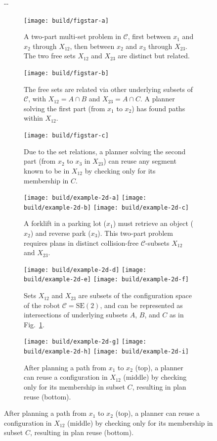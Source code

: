 \documentclass{report}
\newlength{\offsetpage}
\newenvironment{widepage}
   {\begin{adjustwidth}{-\offsetpage}{-\offsetpage}%
    \addtolength{\textwidth}{2\offsetpage}}%
{\end{adjustwidth}}
\begin{document}
\begin{figure}
\begin{widepage}
\centering

\begin{subfigure}[t]{.32\linewidth}
\centering
\texttt{[image: build/figstar-a]}
\caption{A two-part multi-set problem in $\mathcal{C}$,
  first between $x_1$ and $x_2$ through $X_{12}$,
  then between $x_2$ and $x_3$ through $X_{23}$.
  The two free sets $X_{12}$ and $X_{23}$ are distinct
  but related.}
\end{subfigure}%
\quad%
\begin{subfigure}[t]{.32\linewidth}
\centering
\texttt{[image: build/figstar-b]}
\caption{The free sets are related via other underlying
  subsets of $\mathcal{C}$, with $X_{12}=A \cap B$
  and $X_{23}=A \cap C$.
  A planner solving the first part (from $x_1$ to $x_2$)
  has found paths within $X_{12}$.}
\label{subfig:figstar-intersections}
\end{subfigure}%
\quad%
\begin{subfigure}[t]{.32\linewidth}
\centering
\texttt{[image: build/figstar-c]}
\caption{Due to the set relations,
  a planner solving the second part
  (from $x_2$ to $x_3$ in $X_{23}$)
  can reuse any segment known to be in $X_{12}$
  by checking only for its membership in $C$.}
\end{subfigure}

\vspace{0.1in}

\begin{subfigure}[t]{.32\linewidth}
\centering
\texttt{[image: build/example-2d-a]}
\texttt{[image: build/example-2d-b]}
\texttt{[image: build/example-2d-c]}
\caption{A forklift in a parking lot ($x_1$)
  must retrieve an object ($x_2$)
  and reverse park ($x_3$).
  This two-part problem
  requires plans in distinct collision-free
  $\mathcal{C}$-subsets
  $X_{12}$ and $X_{23}$.}
\label{subfig:figstar-manip-probdef}
\end{subfigure}%
\quad%
\begin{subfigure}[t]{.32\linewidth}
\centering
\texttt{[image: build/example-2d-d]}
\texttt{[image: build/example-2d-e]}
\texttt{[image: build/example-2d-f]}
\caption{Sets $X_{12}$ and $X_{23}$ are subsets of
  the configuration space of the robot $\mathcal{C}=\mbox{SE}(2)$,
  and can be represented as intersections
  of underlying subsets $A$, $B$, and $C$
  as in Fig.~\ref{subfig:figstar-intersections}.}
\label{subfig:figstar-manip-spaces}
\end{subfigure}%
\quad%
\begin{subfigure}[t]{.32\linewidth}
\centering
\texttt{[image: build/example-2d-g]}
\texttt{[image: build/example-2d-h]}
\texttt{[image: build/example-2d-i]}
\caption{After planning a path from $x_1$ to $x_2$ (top),
  a planner can reuse a configuration in $X_{12}$ (middle)
  by checking only for its membership in subset $C$,
  resulting in plan reuse (bottom).}
\end{subfigure}


\end{widepage}
\end{figure}
\end{document}
